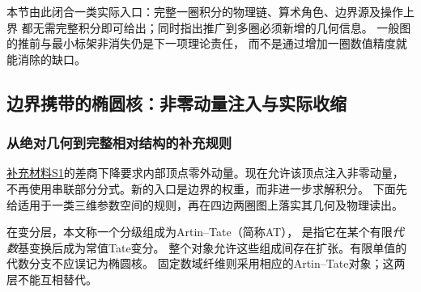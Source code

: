 \documentclass[11pt,a4paper,oneside]{ctexart}
\theoremstyle{cnplain}
\theoremstyle{definition}
\theoremstyle{remark}
\numberwithin{equation}{section}
\newcommand{\otherref}[2]{\href{#1.pdf}{#2}}
\begin{document}
本节由此闭合一类实际入口：完整一圈积分的物理链、算术角色、边界源及操作上界
都无需完整积分即可给出；同时指出推广到多圈必须新增的几何信息。
一般图的推前与最小标架非消失仍是下一项理论责任，
而不是通过增加一圈数值精度就能消除的缺口。



\subsection{边界携带的椭圆核：非零动量注入与实际收缩}
\label{unified:sec:boundaryelliptic}
\subsubsection{从绝对几何到完整相对结构的补充规则}
\otherref{feynman_periods_supplement}{补充材料S1}的差商下降要求内部顶点零外动量。现在允许该顶点注入非零动量，
不再使用串联部分分式。新的入口是边界的权重，而非进一步求解积分。
下面先给适用于一类三维参数空间的规则，再在四边两圈图上落实其几何及物理读出。

在变分层，本文称一个分级组成为Artin--Tate（简称AT），
是指它在某个有限\emph{代数}基变换后成为常值Tate变分。
整个对象允许这些组成间存在扩张。有限单值的代数分支不应误记为椭圆核。
固定数域纤维则采用相应的Artin--Tate对象；这两层不能互相替代。
\end{document}
